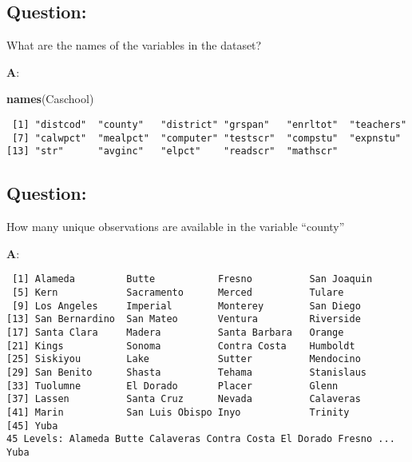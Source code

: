\documentclass[12pt,]{article}
\newenvironment{Shaded}{\begin{snugshade}}{\end{snugshade}}
\newcommand{\KeywordTok}[1]{\textcolor[rgb]{0.13,0.29,0.53}{\textbf{#1}}}
\newcommand{\NormalTok}[1]{#1}
\newcommand{\OperatorTok}[1]{\textcolor[rgb]{0.81,0.36,0.00}{\textbf{#1}}}
\begin{document}
\hypertarget{question-3}{%
\subsection{Question:}\label{question-3}}

What are the names of the variables in the dataset?

\textbf{A}:

\begin{Shaded}
\begin{Highlighting}[]
\KeywordTok{names}\NormalTok{(Caschool)}
\end{Highlighting}
\end{Shaded}

\begin{verbatim}
 [1] "distcod"  "county"   "district" "grspan"   "enrltot"  "teachers"
 [7] "calwpct"  "mealpct"  "computer" "testscr"  "compstu"  "expnstu" 
[13] "str"      "avginc"   "elpct"    "readscr"  "mathscr" 
\end{verbatim}

\hypertarget{question-4}{%
\subsection{Question:}\label{question-4}}

How many unique observations are available in the variable ``county''

\textbf{A}:

\begin{Shaded}
\end{Shaded}

\begin{verbatim}
 [1] Alameda         Butte           Fresno          San Joaquin    
 [5] Kern            Sacramento      Merced          Tulare         
 [9] Los Angeles     Imperial        Monterey        San Diego      
[13] San Bernardino  San Mateo       Ventura         Riverside      
[17] Santa Clara     Madera          Santa Barbara   Orange         
[21] Kings           Sonoma          Contra Costa    Humboldt       
[25] Siskiyou        Lake            Sutter          Mendocino      
[29] San Benito      Shasta          Tehama          Stanislaus     
[33] Tuolumne        El Dorado       Placer          Glenn          
[37] Lassen          Santa Cruz      Nevada          Calaveras      
[41] Marin           San Luis Obispo Inyo            Trinity        
[45] Yuba           
45 Levels: Alameda Butte Calaveras Contra Costa El Dorado Fresno ... Yuba
\end{verbatim}
\end{document}
